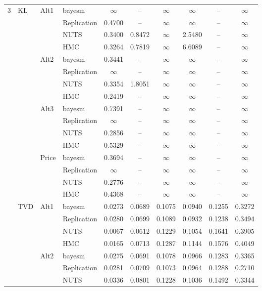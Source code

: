 \begin{longtable}{clllcccccc}
3 & KL & Alt1 & bayesm & $\infty$ & {--} & $\infty$ & $\infty$ & {--} & $\infty$ \\
 &  &  & Replication & 0.4700 & {--} & $\infty$ & $\infty$ & {--} & $\infty$ \\
 &  &  & NUTS & 0.3400 & 0.8472 & $\infty$ & 2.5480 & {--} & $\infty$ \\
 &  &  & HMC & 0.3264 & 0.7819 & $\infty$ & 6.6089 & {--} & $\infty$ \\
 &  & Alt2 & bayesm & 0.3441 & {--} & $\infty$ & $\infty$ & {--} & $\infty$ \\
 &  &  & Replication & $\infty$ & {--} & $\infty$ & $\infty$ & {--} & $\infty$ \\
 &  &  & NUTS & 0.3354 & 1.8051 & $\infty$ & $\infty$ & {--} & $\infty$ \\
 &  &  & HMC & 0.2419 & {--} & $\infty$ & $\infty$ & {--} & $\infty$ \\
 &  & Alt3 & bayesm & 0.7391 & {--} & $\infty$ & $\infty$ & {--} & $\infty$ \\
 &  &  & Replication & $\infty$ & {--} & $\infty$ & $\infty$ & {--} & $\infty$ \\
 &  &  & NUTS & 0.2856 & {--} & $\infty$ & $\infty$ & {--} & $\infty$ \\
 &  &  & HMC & 0.5329 & {--} & $\infty$ & $\infty$ & {--} & $\infty$ \\
 &  & Price & bayesm & 0.3694 & {--} & $\infty$ & $\infty$ & {--} & $\infty$ \\
 &  &  & Replication & $\infty$ & {--} & $\infty$ & $\infty$ & {--} & $\infty$ \\
 &  &  & NUTS & 0.2776 & {--} & $\infty$ & $\infty$ & {--} & $\infty$ \\
 &  &  & HMC & 0.4368 & {--} & $\infty$ & $\infty$ & {--} & $\infty$ \\
 & TVD & Alt1 & bayesm & 0.0273 & 0.0689 & 0.1075 & 0.0940 & 0.1255 & 0.3272 \\
 &  &  & Replication & 0.0280 & 0.0699 & 0.1089 & 0.0932 & 0.1238 & 0.3494 \\
 &  &  & NUTS & 0.0067 & 0.0612 & 0.1229 & 0.1054 & 0.1641 & 0.3905 \\
 &  &  & HMC & 0.0165 & 0.0713 & 0.1287 & 0.1144 & 0.1576 & 0.4049 \\
 &  & Alt2 & bayesm & 0.0275 & 0.0691 & 0.1078 & 0.0966 & 0.1283 & 0.3365 \\
 &  &  & Replication & 0.0281 & 0.0709 & 0.1073 & 0.0964 & 0.1288 & 0.2710 \\
 &  &  & NUTS & 0.0336 & 0.0801 & 0.1228 & 0.1036 & 0.1492 & 0.3344 \\

\end{longtable}
